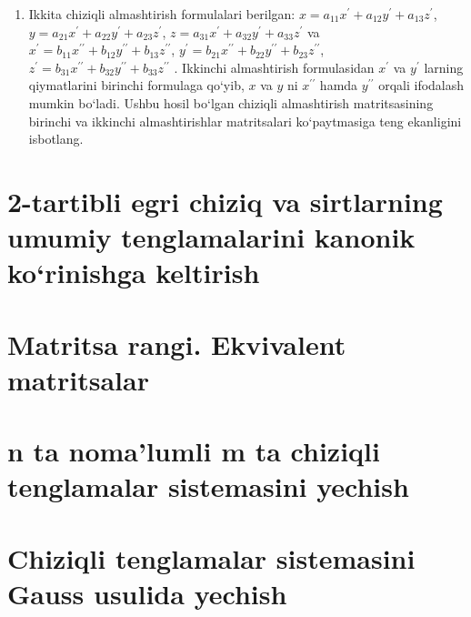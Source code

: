\begin{enumerate}
\item Ikkita chiziqli almashtirish formulalari berilgan: $x=a_{11}x^\prime+a_{12}y^\prime+a_{13}z^\prime$, $y=a_{21}x^\prime+a_{22}y^\prime+a_{23}z^\prime$,
$z=a_{31}x^\prime+a_{32}y^\prime+a_{33}z^\prime$
va 
$x^\prime=b_{11}x^{\prime\prime}+b_{12}y^{\prime\prime}+b_{13}z^{\prime\prime}$,
$y^\prime=b_{21}x^{\prime\prime}+b_{22}y^{\prime\prime}+b_{23}z^{\prime\prime}$,
$z^\prime=b_{31}x^{\prime\prime}+b_{32}y^{\prime\prime}+b_{33}z^{\prime\prime}$
. Ikkinchi almashtirish formulasidan $x^\prime$ va $y^\prime$ larning qiymatlarini birinchi formulaga qo`yib, $x$ va $y$ ni $x^{\prime\prime}$ hamda $y^{\prime\prime}$ orqali ifodalash mumkin bo`ladi. Ushbu hosil bo`lgan chiziqli almashtirish matritsasining birinchi va ikkinchi almashtirishlar matritsalari ko`paytmasiga teng ekanligini isbotlang.
\end{enumerate}

\section{2-tartibli egri chiziq va sirtlarning umumiy tenglamalarini kanonik ko`rinishga keltirish}
\section{Matritsa rangi. Ekvivalent matritsalar}
\section{n ta noma'lumli m ta chiziqli tenglamalar sistemasini yechish}
\section{Chiziqli tenglamalar sistemasini Gauss usulida yechish}


